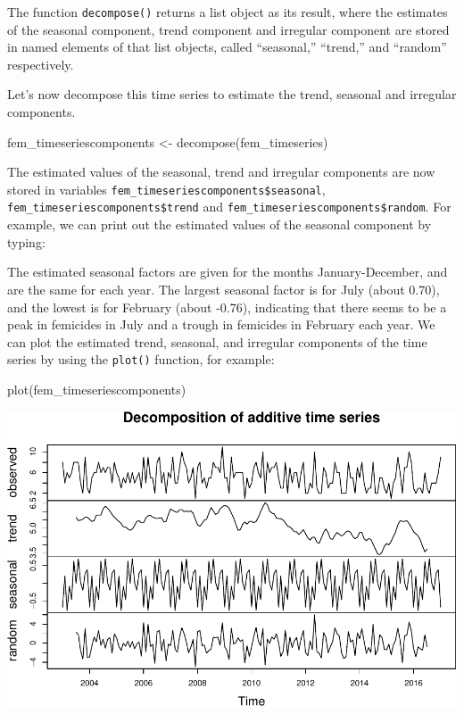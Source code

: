 \documentclass[
]{book}
\makeatletter
\newenvironment{Shaded}{\begin{snugshade}}{\end{snugshade}}
\newcommand{\FunctionTok}[1]{\textcolor[rgb]{0,0,0}{#1}}
\newcommand{\NormalTok}[1]{#1}
\newcommand{\OtherTok}[1]{\textcolor[rgb]{0.37,0.37,0.37}{#1}}
\newcommand{\SpecialCharTok}[1]{\textcolor[rgb]{0,0,0}{#1}}
\newenvironment{kframe}{%
\medskip{}
\setlength{\fboxsep}{.8em}
 \def\at@end@of@kframe{}%
 \ifinner\ifhmode%
  \def\at@end@of@kframe{\end{minipage}}%
  \begin{minipage}{\columnwidth}%
 \fi\fi%
 \def\FrameCommand##1{\hskip\@totalleftmargin \hskip-\fboxsep
 \colorbox{shadecolor}{##1}\hskip-\fboxsep
     \hskip-\linewidth \hskip-\@totalleftmargin \hskip\columnwidth}%
 \MakeFramed {\advance\hsize-\width
   \@totalleftmargin\z@ \linewidth\hsize
   \@setminipage}}%
 {\par\unskip\endMakeFramed%
 \at@end@of@kframe}
\renewenvironment{Shaded}{\begin{kframe}}{\end{kframe}}
\makeatother
\begin{document}
The function \texttt{decompose()} returns a list object as its result, where the estimates of the seasonal component, trend component and irregular component are stored in named elements of that list objects, called ``seasonal,'' ``trend,'' and ``random'' respectively.

Let's now decompose this time series to estimate the trend, seasonal and irregular components.

\begin{Shaded}
\begin{Highlighting}[]
\NormalTok{fem\_timeseriescomponents }\OtherTok{\textless{}{-}} \FunctionTok{decompose}\NormalTok{(fem\_timeseries)}
\end{Highlighting}
\end{Shaded}

The estimated values of the seasonal, trend and irregular components are now stored in variables \texttt{fem\_timeseriescomponents\$seasonal}, \texttt{fem\_timeseriescomponents\$trend} and \texttt{fem\_timeseriescomponents\$random}. For example, we can print out the estimated values of the seasonal component by typing:

\begin{Shaded}
\end{Shaded}

The estimated seasonal factors are given for the months January-December, and are the same for each year. The largest seasonal factor is for July (about 0.70), and the lowest is for February (about -0.76), indicating that there seems to be a peak in femicides in July and a trough in femicides in February each year. We can plot the estimated trend, seasonal, and irregular components of the time series by using the \texttt{plot()} function, for example:

\begin{Shaded}
\begin{Highlighting}[]
\FunctionTok{plot}\NormalTok{(fem\_timeseriescomponents)}
\end{Highlighting}
\end{Shaded}

\includegraphics{crime_mapping_files/figure-latex/unnamed-chunk-176-1.pdf}
\end{document}
